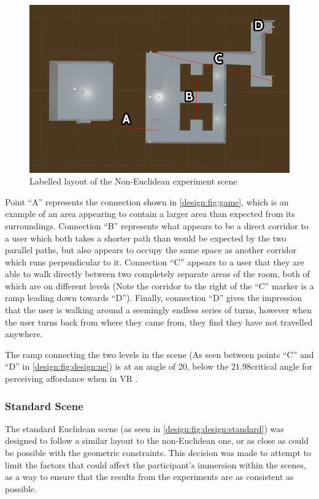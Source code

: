 			\begin{figure}[H]
				\includegraphics[width=1\textwidth]{Images/NE_Layout}
				\centering
				\caption{Labelled layout of the Non-Euclidean experiment scene}
				\label{design:fig:design:ne}
			\end{figure}

			Point \enquote{A} represents the connection shown in \autoref{design:fig:game}, which is an example of an area appearing to contain a larger area than expected from its surroundings.
			Connection \enquote{B} represents what appears to be a direct corridor to a user which both takes a shorter path than would be expected by the two parallel paths, but also appears to occupy the same space as another corridor which runs perpendicular to it.
			Connection \enquote{C} appears to a user that they are able to walk directly between two completely separate areas of the room, both of which are on different levels (Note the corridor to the right of the \enquote{C} marker is a ramp leading down towards \enquote{D}).
			Finally, connection \enquote{D} gives the impression that the user is walking around a seemingly endless series of turns, however when the user turns back from where they came from, they find they have not travelled anywhere.

			The ramp connecting the two levels in the scene (As seen between points \enquote{C} and \enquote{D} in \autoref{design:fig:design:ne}) is at an angle of 20\degree, below the 21.98\degree critical angle for perceiving affordance when in VR \cite{Regia-Corte2012}.

		\subsubsection{Standard Scene}
			The standard Euclidean scene (as seen in \autoref{design:fig:design:standard}) was designed to follow a similar layout to the non-Euclidean one, or as close as could be possible with the geometric constraints.
			This decision was made to attempt to limit the factors that could affect the participant's immersion within the scenes, as a way to ensure that the results from the experiments are as consistent as possible.

